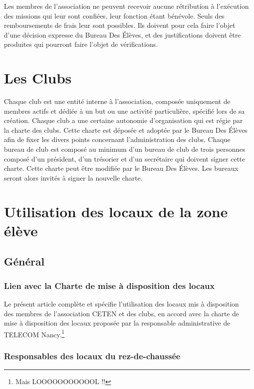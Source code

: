 \documentclass{article} %
\begin{document}
			Les membres de l’association ne peuvent recevoir aucune rétribution
			à l'exécution des missions qui leur sont confiées, leur fonction
			étant bénévole. Seuls des remboursements de frais leur sont
			possibles. Ils doivent pour cela faire l'objet d'une décision
			expresse du Bureau Des Élèves, et des justifications doivent être
			produites qui pourront faire l'objet de vérifications.

	\section{Les Clubs}

		Chaque club est une entité interne à l’association, composée uniquement de
		membres actifs et dédiée à un but ou une activité particulière, spécifié lors
		de sa création.	Chaque club a une certaine autonomie d'organisation qui est
		régie par la charte des clubs. Cette charte est déposée et adoptée par le
		Bureau Des Élèves afin de fixer les divers points concernant l’administration
		des clubs. Chaque bureau de club est composé au minimum d’un bureau de club
		de trois personnes composé d’un président, d’un trésorier et d’un secrétaire
		qui doivent signer cette charte. Cette charte peut être modifiée par le
		Bureau Des Élèves. Les bureaux seront alors invités à signer la nouvelle
		charte.

	\section{Utilisation des locaux de la zone élève}
		
		\subsection{Général}

			\subsubsection{Lien avec la Charte de mise à disposition des locaux}

				Le présent article complète et spécifie l’utilisation des locaux
				mis à disposition des membres de l’association CETEN et des
				clubs, en accord avec la charte de mise à disposition des locaux
				proposée par la responsable administrative de TELECOM
				Nancy.\footnote{Mais LOOOOOOOOOOOL !!}

			\subsubsection{Responsables des locaux du rez-de-chaussée}
\end{document}

